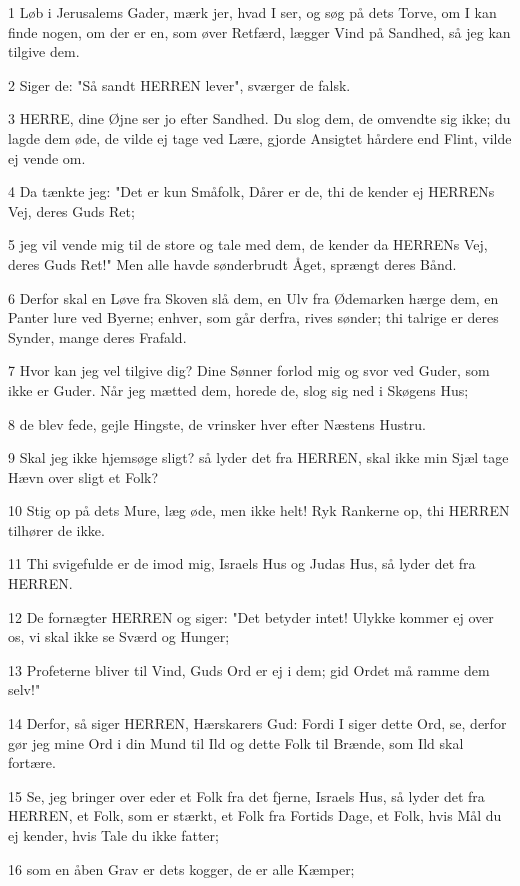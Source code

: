 \par 1 Løb i Jerusalems Gader, mærk jer, hvad I ser, og søg på dets Torve, om I kan finde nogen, om der er en, som øver Retfærd, lægger Vind på Sandhed, så jeg kan tilgive dem.
\par 2 Siger de: "Så sandt HERREN lever", sværger de falsk.
\par 3 HERRE, dine Øjne ser jo efter Sandhed. Du slog dem, de omvendte sig ikke; du lagde dem øde, de vilde ej tage ved Lære, gjorde Ansigtet hårdere end Flint, vilde ej vende om.
\par 4 Da tænkte jeg: "Det er kun Småfolk, Dårer er de, thi de kender ej HERRENs Vej, deres Guds Ret;
\par 5 jeg vil vende mig til de store og tale med dem, de kender da HERRENs Vej, deres Guds Ret!" Men alle havde sønderbrudt Åget, sprængt deres Bånd.
\par 6 Derfor skal en Løve fra Skoven slå dem, en Ulv fra Ødemarken hærge dem, en Panter lure ved Byerne; enhver, som går derfra, rives sønder; thi talrige er deres Synder, mange deres Frafald.
\par 7 Hvor kan jeg vel tilgive dig? Dine Sønner forlod mig og svor ved Guder, som ikke er Guder. Når jeg mætted dem, horede de, slog sig ned i Skøgens Hus;
\par 8 de blev fede, gejle Hingste, de vrinsker hver efter Næstens Hustru.
\par 9 Skal jeg ikke hjemsøge sligt? så lyder det fra HERREN, skal ikke min Sjæl tage Hævn over sligt et Folk?
\par 10 Stig op på dets Mure, læg øde, men ikke helt! Ryk Rankerne op, thi HERREN tilhører de ikke.
\par 11 Thi svigefulde er de imod mig, Israels Hus og Judas Hus, så lyder det fra HERREN.
\par 12 De fornægter HERREN og siger: "Det betyder intet! Ulykke kommer ej over os, vi skal ikke se Sværd og Hunger;
\par 13 Profeterne bliver til Vind, Guds Ord er ej i dem; gid Ordet må ramme dem selv!"
\par 14 Derfor, så siger HERREN, Hærskarers Gud: Fordi I siger dette Ord, se, derfor gør jeg mine Ord i din Mund til Ild og dette Folk til Brænde, som Ild skal fortære.
\par 15 Se, jeg bringer over eder et Folk fra det fjerne, Israels Hus, så lyder det fra HERREN, et Folk, som er stærkt, et Folk fra Fortids Dage, et Folk, hvis Mål du ej kender, hvis Tale du ikke fatter;
\par 16 som en åben Grav er dets kogger, de er alle Kæmper;
